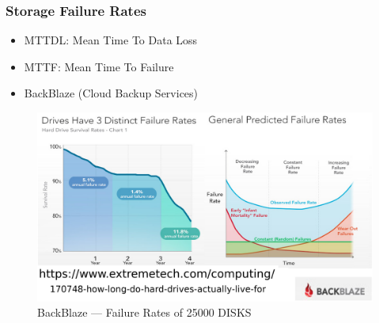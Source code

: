 \documentclass[xcolor=table, notheorems, hyperref={pdfpagelabels=false}]{beamer}
\begin{document}
\begin{frame}
\frametitle{Storage Failure Rates}
\begin{itemize}
\item MTTDL: Mean Time To Data Loss
\item MTTF: Mean Time To Failure
\item BackBlaze (Cloud Backup Services)
\end{itemize}
\begin{figure}
\includegraphics[width=0.80\linewidth]{os-extreme-tech}
\caption{BackBlaze --- Failure Rates of 25000 DISKS}
\end{figure}
\end{frame}

\end{document}
